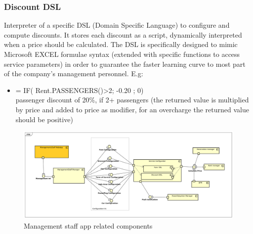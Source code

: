 \documentclass[english]{article}
\begin{document}
		\subsubsection{Discount DSL}
		Interpreter of a specific DSL (Domain Specific Language) to configure and compute discounts. It stores each discount as a script,  dynamically interpreted when a price should be calculated. The DSL is specifically designed to mimic Microsoft EXCEL formulae syntax (extended with specific functions to access service parameters) in order to guarantee the faster learning curve to most part of the company's management personnel.
		E.g: 
		\begin{itemize}
			\item { = IF( Rent.PASSENGERS()>2; -0.20 ; 0)     \\passenger discount of 20\%, if 2+ passengers (the returned value is multiplied by price and added to price as modifier, for an overcharge the returned value should be positive) }
		\end{itemize}
	\begin{figure}[H]
		\centering
		\includegraphics[scale=0.26]{./ComponentDiagrams/ManagementStaff.pdf}%
		\caption{Management staff app related components}
	\end{figure}
	
	
\end{document}
